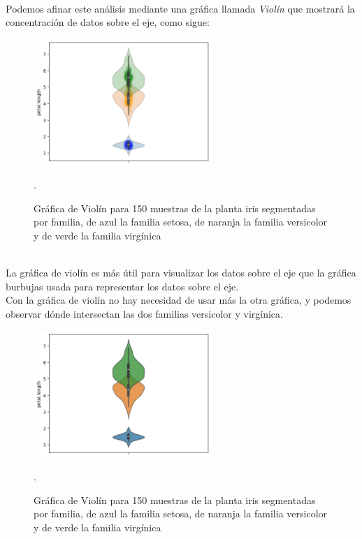 \documentclass{article}
\begin{document}
\hfill\hfill\\
Podemos afinar este análisis mediante una gráfica llamada \textit{Violín} que mostrará la concentración de datos sobre el eje, como sigue:
\begin{figure}[h]
    \centering
    \includegraphics[width=0.6\textwidth]{figures/violin1.png}
    \captionsetup{width=0.8\textwidth}
    \caption{Gráfica de Violín para 150 muestras de la planta iris segmentadas por familia, de azul la familia setosa, de naranja la familia versicolor y de verde la familia virgínica}.
    \label{fig:violin1}
\end{figure}
\\
La gráfica de violín es más útil para visualizar los datos sobre el eje que la gráfica burbujas usada para representar los datos sobre el eje.
\\[12pt]
Con la gráfica de violín no hay necesidad de usar más la otra gráfica, y podemos observar dónde intersectan las dos familias versicolor y virgínica.
\begin{figure}[h]
    \centering
    \includegraphics[width=0.6\textwidth]{figures/violin2.png}
    \captionsetup{width=0.8\textwidth}
    \caption{Gráfica de Violín para 150 muestras de la planta iris segmentadas por familia, de azul la familia setosa, de naranja la familia versicolor y de verde la familia virgínica}.
    \label{fig:violin2}
\end{figure}
\end{document}
